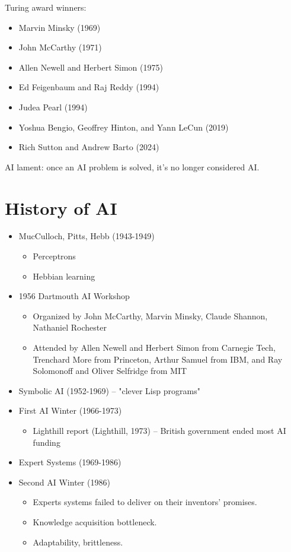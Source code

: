 \documentclass[11pt]{article}
\begin{document}
Turing award winners:

\begin{itemize}
\item Marvin Minsky (1969)
\item John McCarthy (1971)
\item Allen Newell and Herbert Simon (1975)
\item Ed Feigenbaum and Raj Reddy (1994)
\item Judea Pearl (1994)
\item Yoshua Bengio, Geoffrey Hinton, and Yann LeCun (2019)
\item Rich Sutton and Andrew Barto (2024)
\end{itemize}

AI lament: once an AI problem is solved, it's no longer considered AI.
\section{History of AI}
\label{sec:org05ab996}

\begin{itemize}
\item MucCulloch, Pitts, Hebb (1943-1949)

\begin{itemize}
\item Perceptrons
\item Hebbian learning
\end{itemize}

\item 1956 Dartmouth AI Workshop

\begin{itemize}
\item Organized by John McCarthy, Marvin Minsky, Claude Shannon, Nathaniel Rochester
\item Attended by Allen Newell and Herbert Simon from Carnegie Tech, Trenchard More from Princeton, Arthur Samuel from IBM, and Ray Solomonoff and Oliver Selfridge from MIT
\end{itemize}

\item Symbolic AI (1952-1969) -- "clever Lisp programs"

\item First AI Winter (1966-1973)

\begin{itemize}
\item Lighthill report (Lighthill, 1973) -- British government ended most AI funding
\end{itemize}

\item Expert Systems (1969-1986)

\item Second AI Winter (1986)

\begin{itemize}
\item Experts systems failed to deliver on their inventors' promises.
\item Knowledge acquisition bottleneck.
\item Adaptability, brittleness.
\end{itemize}
\end{itemize}
\end{document}
